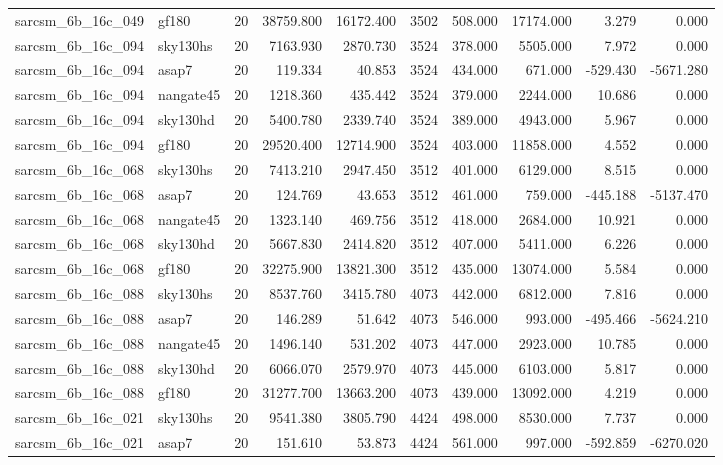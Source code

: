 \begin{longtable}{llrrrrrrrr}
sarcsm\_6b\_16c\_049 & gf180 & 20 & 38759.800 & 16172.400 & 3502 & 508.000 & 17174.000 & 3.279 & 0.000 \\
sarcsm\_6b\_16c\_094 & sky130hs & 20 & 7163.930 & 2870.730 & 3524 & 378.000 & 5505.000 & 7.972 & 0.000 \\
sarcsm\_6b\_16c\_094 & asap7 & 20 & 119.334 & 40.853 & 3524 & 434.000 & 671.000 & -529.430 & -5671.280 \\
sarcsm\_6b\_16c\_094 & nangate45 & 20 & 1218.360 & 435.442 & 3524 & 379.000 & 2244.000 & 10.686 & 0.000 \\
sarcsm\_6b\_16c\_094 & sky130hd & 20 & 5400.780 & 2339.740 & 3524 & 389.000 & 4943.000 & 5.967 & 0.000 \\
sarcsm\_6b\_16c\_094 & gf180 & 20 & 29520.400 & 12714.900 & 3524 & 403.000 & 11858.000 & 4.552 & 0.000 \\
sarcsm\_6b\_16c\_068 & sky130hs & 20 & 7413.210 & 2947.450 & 3512 & 401.000 & 6129.000 & 8.515 & 0.000 \\
sarcsm\_6b\_16c\_068 & asap7 & 20 & 124.769 & 43.653 & 3512 & 461.000 & 759.000 & -445.188 & -5137.470 \\
sarcsm\_6b\_16c\_068 & nangate45 & 20 & 1323.140 & 469.756 & 3512 & 418.000 & 2684.000 & 10.921 & 0.000 \\
sarcsm\_6b\_16c\_068 & sky130hd & 20 & 5667.830 & 2414.820 & 3512 & 407.000 & 5411.000 & 6.226 & 0.000 \\
sarcsm\_6b\_16c\_068 & gf180 & 20 & 32275.900 & 13821.300 & 3512 & 435.000 & 13074.000 & 5.584 & 0.000 \\
sarcsm\_6b\_16c\_088 & sky130hs & 20 & 8537.760 & 3415.780 & 4073 & 442.000 & 6812.000 & 7.816 & 0.000 \\
sarcsm\_6b\_16c\_088 & asap7 & 20 & 146.289 & 51.642 & 4073 & 546.000 & 993.000 & -495.466 & -5624.210 \\
sarcsm\_6b\_16c\_088 & nangate45 & 20 & 1496.140 & 531.202 & 4073 & 447.000 & 2923.000 & 10.785 & 0.000 \\
sarcsm\_6b\_16c\_088 & sky130hd & 20 & 6066.070 & 2579.970 & 4073 & 445.000 & 6103.000 & 5.817 & 0.000 \\
sarcsm\_6b\_16c\_088 & gf180 & 20 & 31277.700 & 13663.200 & 4073 & 439.000 & 13092.000 & 4.219 & 0.000 \\
sarcsm\_6b\_16c\_021 & sky130hs & 20 & 9541.380 & 3805.790 & 4424 & 498.000 & 8530.000 & 7.737 & 0.000 \\
sarcsm\_6b\_16c\_021 & asap7 & 20 & 151.610 & 53.873 & 4424 & 561.000 & 997.000 & -592.859 & -6270.020 \\

\end{longtable}
